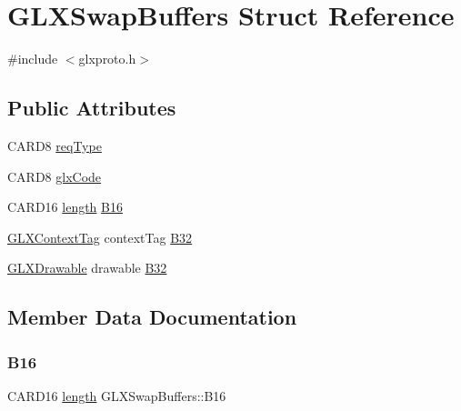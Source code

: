 \hypertarget{struct_g_l_x_swap_buffers}{}\section{G\+L\+X\+Swap\+Buffers Struct Reference}
\label{struct_g_l_x_swap_buffers}


{\ttfamily \#include $<$glxproto.\+h$>$}

\subsection*{Public Attributes}
\begin{DoxyCompactItemize}
\item 
C\+A\+R\+D8 \hyperlink{struct_g_l_x_swap_buffers_a14c2ecd543466c4bbf9381d481fea661}{req\+Type}
\item 
C\+A\+R\+D8 \hyperlink{struct_g_l_x_swap_buffers_a0b4205dc4eba97e006db75e0585dfe0c}{glx\+Code}
\item 
C\+A\+R\+D16 \hyperlink{glcorearb_8h_ab9c919755bde3b34349e23a32b4e0fa7}{length} \hyperlink{struct_g_l_x_swap_buffers_acc2c7effc7f8214e916923947e8f60e2}{B16}
\item 
\hyperlink{glxproto_8h_ae71763ce00c9fa460beb4699af678691}{G\+L\+X\+Context\+Tag} context\+Tag \hyperlink{struct_g_l_x_swap_buffers_a71345d7c617b6712642c6b9dd7aa436c}{B32}
\item 
\hyperlink{glx_8h_a826f51745d9d6c81bdbac47ae2b80cf7}{G\+L\+X\+Drawable} drawable \hyperlink{struct_g_l_x_swap_buffers_ac1b2254013036fc98464425feaf66c65}{B32}
\end{DoxyCompactItemize}


\subsection{Member Data Documentation}
\mbox{\label{struct_g_l_x_swap_buffers_acc2c7effc7f8214e916923947e8f60e2}} 
\subsubsection{\texorpdfstring{B16}{B16}}
{\footnotesize\ttfamily C\+A\+R\+D16 \hyperlink{glcorearb_8h_ab9c919755bde3b34349e23a32b4e0fa7}{length} G\+L\+X\+Swap\+Buffers\+::\+B16}

